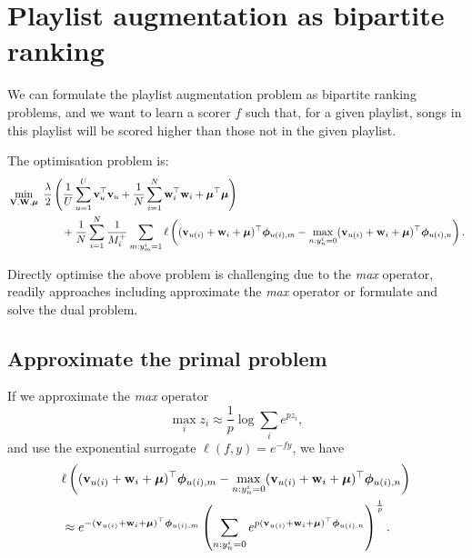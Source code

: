 \section{Playlist augmentation as bipartite ranking}

We can formulate the playlist augmentation problem as bipartite ranking problems, 
and we want to learn a scorer $f$ such that, for a given playlist, 
songs in this playlist will be scored higher than those not in the given playlist.

The optimisation problem is:
\begin{equation}
\label{eq:primal_pla}
\begin{aligned}
&\min_{\mathbf{V}, \mathbf{W}, \bm{\mu}} \ \frac{\lambda}{2} \left( \frac{1}{U} \sum_{u=1}^U \mathbf{v}_u^\top \mathbf{v}_u 
     + \frac{1}{N} \sum_{i=1}^N \mathbf{w}_i^\top \mathbf{w}_i + \bm{\mu}^\top \bm{\mu} \right) \\
& \hspace{5em}
     + \frac{1}{N} \sum_{i=1}^N \frac{1}{M_i^+} \sum_{m: y_m^i = 1} \ell \left( (\mathbf{v}_{u(i)} + \mathbf{w}_i + \bm{\mu})^\top \bm{\phi}_{u(i),m}
     - \max_{n: y_n^i = 0} (\mathbf{v}_{u(i)} + \mathbf{w}_i + \bm{\mu})^\top \bm{\phi}_{u(i),n} \right).
\end{aligned}
\end{equation}

Directly optimise the above problem is challenging due to the \emph{max} operator,
readily approaches including approximate the \emph{max} operator or formulate and solve the dual problem.


\subsection{Approximate the primal problem}
If we approximate the \emph{max} operator
\begin{equation*}
\max_i z_i \approx \frac{1}{p} \log \sum_i e^{p z_i},
\end{equation*}
and use the exponential surrogate $\ell(f, y) = e^{-fy}$, we have
\begin{equation*}
\begin{aligned}
&\ell \left( (\mathbf{v}_{u(i)} + \mathbf{w}_i + \bm{\mu})^\top \bm{\phi}_{u(i),m} - \max_{n: y_n^i = 0} (\mathbf{v}_{u(i)} + \mathbf{w}_i + \bm{\mu})^\top \bm{\phi}_{u(i),n} \right) \\
&\approx e^{-(\mathbf{v}_{u(i)} + \mathbf{w}_i + \bm{\mu})^\top \bm{\phi}_{u(i),m}}
   \left( \sum_{n: y_n^i = 0} e^{p (\mathbf{v}_{u(i)} + \mathbf{w}_i + \bm{\mu})^\top \bm{\phi}_{u(i),n}} \right)^\frac{1}{p}.
\end{aligned}
\end{equation*}

